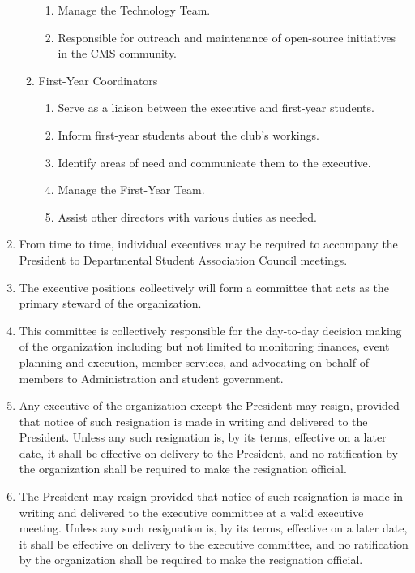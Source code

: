 \documentclass[12pt,a4paper]{article}
\begin{document}
\begin{enumerate}
\begin{enumerate}
\begin{enumerate}
\item Manage the Technology Team.

\item Responsible for outreach and maintenance of open-source initiatives in the CMS community.
\end{enumerate}

\item First-Year Coordinators

\begin{enumerate}
\item Serve as a liaison between the executive and first-year students.

\item Inform first-year students about the club's workings.

\item Identify areas of need and communicate them to the executive.

\item Manage the First-Year Team.

\item Assist other directors with various duties as needed.
\end{enumerate}
\end{enumerate}

\item From time to time, individual executives may be required to accompany the President to Departmental Student Association Council meetings.

\item The executive positions collectively will form a committee that acts as the primary steward of the organization.

\item This committee is collectively responsible for the day-to-day decision making of the organization including but not limited to monitoring finances, event planning and execution, member services, and advocating on behalf of members to Administration and student government.

\item Any executive of the organization except the President may resign, provided that notice of such resignation is made in writing and delivered to the President. Unless any such resignation is, by its terms, effective on a later date, it shall be effective on delivery to the President, and no ratification by the organization shall be required to make the resignation official.

\item The President may resign provided that notice of such resignation is made in writing and delivered to the executive committee at a valid executive meeting. Unless any such resignation is, by its terms, effective on a later date, it shall be effective on delivery to the executive committee, and no ratification by the organization shall be required to make the resignation official.


\end{enumerate}
\end{document}

